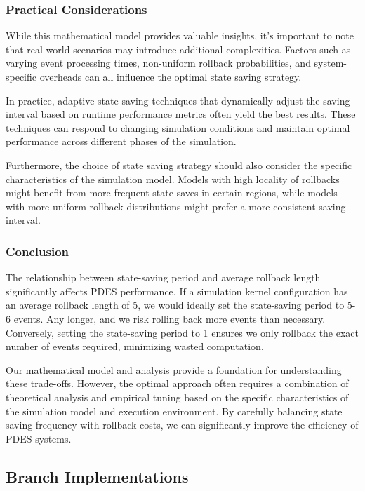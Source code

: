 \subsubsection{Practical Considerations}

While this mathematical model provides valuable insights, it's important to note that real-world scenarios may introduce additional complexities. Factors such as varying event processing times, non-uniform rollback probabilities, and system-specific overheads can all influence the optimal state saving strategy.

In practice, adaptive state saving techniques that dynamically adjust the saving interval based on runtime performance metrics often yield the best results. These techniques can respond to changing simulation conditions and maintain optimal performance across different phases of the simulation.

Furthermore, the choice of state saving strategy should also consider the specific characteristics of the simulation model. Models with high locality of rollbacks might benefit from more frequent state saves in certain regions, while models with more uniform rollback distributions might prefer a more consistent saving interval.

\subsubsection{Conclusion}

The relationship between state-saving period and average rollback length significantly affects PDES performance. If a simulation kernel configuration has an average rollback length of 5, we would ideally set the state-saving period to 5-6 events. Any longer, and we risk rolling back more events than necessary. Conversely, setting the state-saving period to 1 ensures we only rollback the exact number of events required, minimizing wasted computation.

Our mathematical model and analysis provide a foundation for understanding these trade-offs. However, the optimal approach often requires a combination of theoretical analysis and empirical tuning based on the specific characteristics of the simulation model and execution environment. By carefully balancing state saving frequency with rollback costs, we can significantly improve the efficiency of PDES systems.

\subsection{Branch Implementations}

